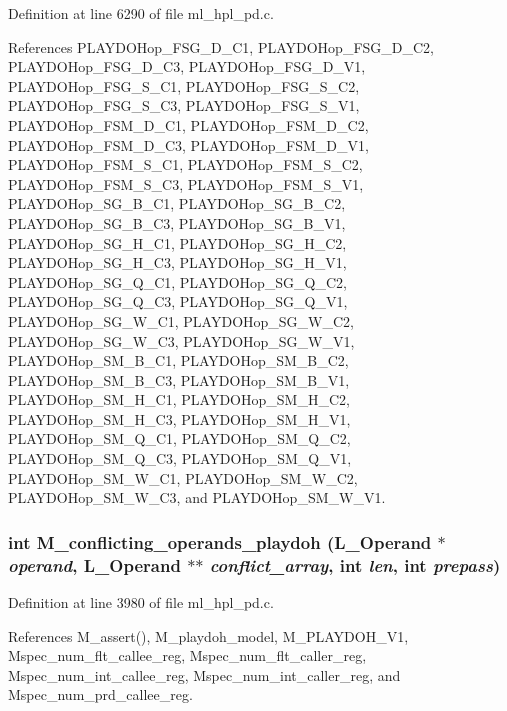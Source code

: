 Definition at line 6290 of file ml\_\-hpl\_\-pd.c.

References PLAYDOHop\_\-FSG\_\-D\_\-C1, PLAYDOHop\_\-FSG\_\-D\_\-C2, PLAYDOHop\_\-FSG\_\-D\_\-C3, PLAYDOHop\_\-FSG\_\-D\_\-V1, PLAYDOHop\_\-FSG\_\-S\_\-C1, PLAYDOHop\_\-FSG\_\-S\_\-C2, PLAYDOHop\_\-FSG\_\-S\_\-C3, PLAYDOHop\_\-FSG\_\-S\_\-V1, PLAYDOHop\_\-FSM\_\-D\_\-C1, PLAYDOHop\_\-FSM\_\-D\_\-C2, PLAYDOHop\_\-FSM\_\-D\_\-C3, PLAYDOHop\_\-FSM\_\-D\_\-V1, PLAYDOHop\_\-FSM\_\-S\_\-C1, PLAYDOHop\_\-FSM\_\-S\_\-C2, PLAYDOHop\_\-FSM\_\-S\_\-C3, PLAYDOHop\_\-FSM\_\-S\_\-V1, PLAYDOHop\_\-SG\_\-B\_\-C1, PLAYDOHop\_\-SG\_\-B\_\-C2, PLAYDOHop\_\-SG\_\-B\_\-C3, PLAYDOHop\_\-SG\_\-B\_\-V1, PLAYDOHop\_\-SG\_\-H\_\-C1, PLAYDOHop\_\-SG\_\-H\_\-C2, PLAYDOHop\_\-SG\_\-H\_\-C3, PLAYDOHop\_\-SG\_\-H\_\-V1, PLAYDOHop\_\-SG\_\-Q\_\-C1, PLAYDOHop\_\-SG\_\-Q\_\-C2, PLAYDOHop\_\-SG\_\-Q\_\-C3, PLAYDOHop\_\-SG\_\-Q\_\-V1, PLAYDOHop\_\-SG\_\-W\_\-C1, PLAYDOHop\_\-SG\_\-W\_\-C2, PLAYDOHop\_\-SG\_\-W\_\-C3, PLAYDOHop\_\-SG\_\-W\_\-V1, PLAYDOHop\_\-SM\_\-B\_\-C1, PLAYDOHop\_\-SM\_\-B\_\-C2, PLAYDOHop\_\-SM\_\-B\_\-C3, PLAYDOHop\_\-SM\_\-B\_\-V1, PLAYDOHop\_\-SM\_\-H\_\-C1, PLAYDOHop\_\-SM\_\-H\_\-C2, PLAYDOHop\_\-SM\_\-H\_\-C3, PLAYDOHop\_\-SM\_\-H\_\-V1, PLAYDOHop\_\-SM\_\-Q\_\-C1, PLAYDOHop\_\-SM\_\-Q\_\-C2, PLAYDOHop\_\-SM\_\-Q\_\-C3, PLAYDOHop\_\-SM\_\-Q\_\-V1, PLAYDOHop\_\-SM\_\-W\_\-C1, PLAYDOHop\_\-SM\_\-W\_\-C2, PLAYDOHop\_\-SM\_\-W\_\-C3, and PLAYDOHop\_\-SM\_\-W\_\-V1.
\subsubsection{\setlength{\rightskip}{0pt plus 5cm}int M\_\-conflicting\_\-operands\_\-playdoh (L\_\-Operand $\ast$ {\em operand}, L\_\-Operand $\ast$$\ast$ {\em conflict\_\-array}, int {\em len}, int {\em prepass})}\label{ml__hpl__pd_8c_54a0db73512c89a67f0af2cc6423c1fa}




Definition at line 3980 of file ml\_\-hpl\_\-pd.c.

References M\_\-assert(), M\_\-playdoh\_\-model, M\_\-PLAYDOH\_\-V1, Mspec\_\-num\_\-flt\_\-callee\_\-reg, Mspec\_\-num\_\-flt\_\-caller\_\-reg, Mspec\_\-num\_\-int\_\-callee\_\-reg, Mspec\_\-num\_\-int\_\-caller\_\-reg, and Mspec\_\-num\_\-prd\_\-callee\_\-reg.

